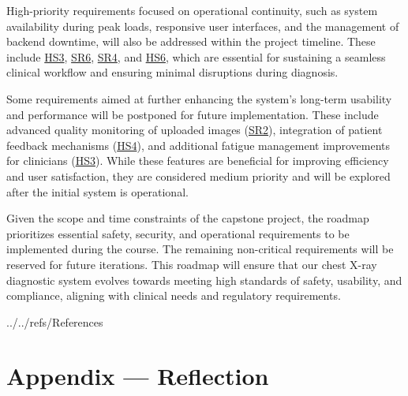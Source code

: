 \documentclass{article}
\begin{document}
\noindent High-priority requirements focused on operational continuity, such as system availability during peak loads, responsive user interfaces, and the management of backend downtime, will also be addressed within the project timeline. These include \hyperlink{HS3}{HS3}, \hyperlink{SR6}{SR6}, \hyperlink{SR4}{SR4}, and \hyperlink{HS6}{HS6}, which are essential for sustaining a seamless clinical workflow and ensuring minimal disruptions during diagnosis.
\vspace{0.2cm}

\noindent Some requirements aimed at further enhancing the system’s long-term usability and performance will be postponed for future implementation. These include advanced quality monitoring of uploaded images (\hyperlink{SR2}{SR2}), integration of patient feedback mechanisms (\hyperlink{HS4}{HS4}), and additional fatigue management improvements for clinicians (\hyperlink{HS3}{HS3}). While these features are beneficial for improving efficiency and user satisfaction, they are considered medium priority and will be explored after the initial system is operational.
\vspace{0.2cm}

\noindent Given the scope and time constraints of the capstone project, the roadmap prioritizes essential safety, security, and operational requirements to be implemented during the course. The remaining non-critical requirements will be reserved for future iterations. This roadmap will ensure that our chest X-ray diagnostic system evolves towards meeting high standards of safety, usability, and compliance, aligning with clinical needs and regulatory requirements.
\newpage{}

 {../../refs/References}
\newpage
\section*{Appendix --- Reflection}
\end{document}
